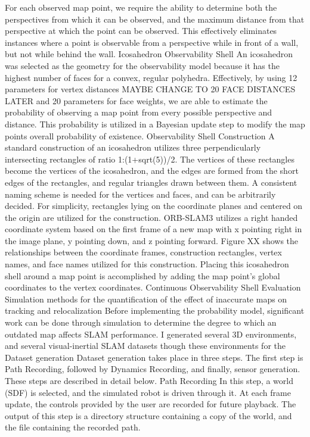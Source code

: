 \documentclass[12pt]{article}
\begin{document}
For each observed map point, we require the ability to determine both the perspectives from which it can be observed, and the maximum distance from that perspective at which the point can be observed. This effectively eliminates instances where a point is observable from a perspective while in front of a wall, but not while behind the wall.
Icosahedron Observability Shell
An icosahedron was selected as the geometry for the observability model because it has the highest number of faces for a convex, regular polyhedra. Effectively, by using 12 parameters for vertex distances MAYBE CHANGE TO 20 FACE DISTANCES LATER and 20 parameters for face weights, we are able to estimate the probability of observing a map point from every possible perspective and distance. This probability is utilized in a Bayesian update step to modify the map points overall probability of existence.
Observability Shell Construction
A standard construction of an icosahedron utilizes three perpendicularly intersecting rectangles of ratio 1:(1+sqrt(5))/2. The vertices of these rectangles become the vertices of the icosahedron, and the edges are formed from the short edges of the rectangles, and regular triangles drawn between them. A consistent naming scheme is needed for the vertices and faces, and can be arbitrarily decided. For simplicity, rectangles lying on the coordinate planes and centered on the origin are utilized for the construction. ORB-SLAM3 utilizes a right handed coordinate system based on the first frame of a new map with x pointing right in the image plane, y pointing down, and z pointing forward. Figure XX shows the relationships between the coordinate frames, construction rectangles, vertex names, and face names utilized for this construction. Placing this icosahedron shell around a map point is accomplished by adding the map point’s global coordinates to the vertex coordinates.
Continuous Observability Shell
Evaluation
Simulation methods for the quantification of the effect of inaccurate maps on tracking and relocalization
Before implementing the probability model, significant work can be done through simulation to determine the degree to which an outdated map affects SLAM performance. I generated several 3D environments, and several visual-inertial SLAM datasets though these environments for the
Dataset generation
Dataset generation takes place in three steps. The first step is Path Recording, followed by Dynamics Recording, and finally, sensor generation. These steps are described in detail below.
Path Recording
In this step, a world (SDF) is selected, and the simulated robot is driven through it. At each frame update, the controls provided by the user are recorded for future playback. The output of this step is a directory structure containing a copy of the world, and the file containing the recorded path.
\end{document}
